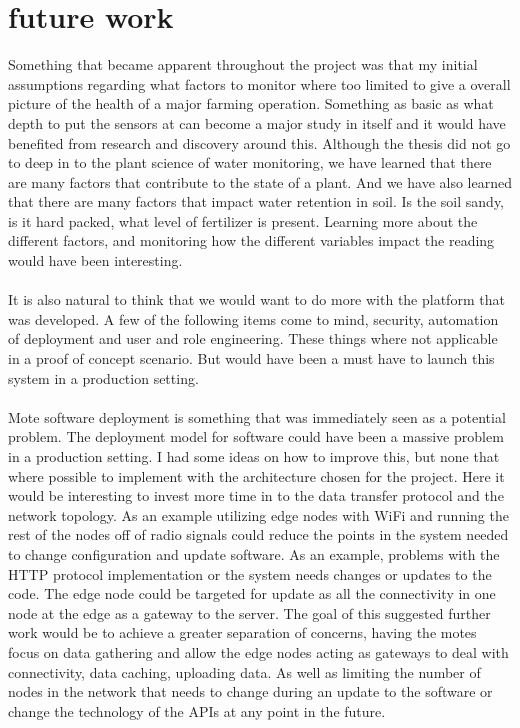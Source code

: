 \documentclass[]{uiophd}
\begin{document}
\section{future work}
Something that became apparent throughout the project was that my initial assumptions regarding what factors to monitor where too limited to give  a overall picture of the health of a major farming operation. Something as basic as what depth to put the sensors at can become a  major study in itself and it would have benefited from research and discovery around this. Although the thesis did not go to deep in to the plant science of water monitoring, we have learned that there are many factors that contribute to the state of a plant. And we have also learned that there are many factors that impact water retention in soil. Is the soil sandy, is it hard packed, what level of fertilizer is present. Learning more about the different factors, and monitoring how the different variables impact the reading would have been interesting.
\\\\
It is also natural to think that we would want to do more with the platform that was developed. A few of the following items come to mind, security, automation of deployment and user and role engineering. These things where not applicable in a proof of concept scenario. But would have been a must have to  launch this system in a production setting.
\\\\
Mote software deployment is something that was immediately seen as a potential problem. The deployment model for software could have been a massive problem in a production setting. I had some ideas on how to improve this, but none that where possible to implement with the architecture chosen for the project. Here it would be interesting to invest more time in to the data transfer protocol and the network topology. As an example utilizing edge nodes with WiFi and running the rest of the nodes off of radio signals could reduce the points in the system needed to change configuration and update software. As an example, problems with the HTTP protocol implementation or the system needs changes or updates to the code. The edge node could be targeted for update as all the connectivity in one node at the edge as a gateway to the server. The goal of this suggested further work would be to achieve a greater separation of concerns, having the motes focus on data gathering and allow the edge nodes acting as gateways to deal with connectivity, data caching, uploading data. As well as limiting the number of nodes in the network that needs to change during an update to the software or change the technology of the APIs at any point in the future.
\end{document}
